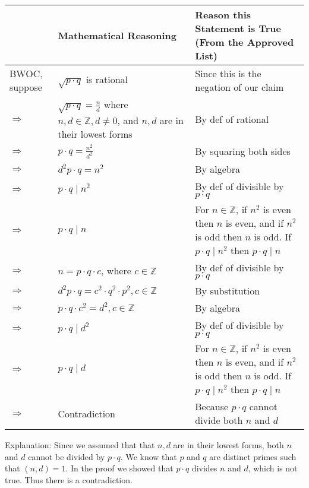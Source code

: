 \documentclass{article}
\begin{document}
\begin{flushleft}
    \begin{tabular}{|p{1.3cm}|p{5.4cm}|p{5.8cm}|}
    \hline
     & \textbf{Mathematical Reasoning} & \textbf{Reason this Statement is True (From the Approved List)} \\
    \hline
    BWOC, suppose & $\sqrt{p\cdot q}$ is rational & Since this is the negation of our claim \\
    \hline
    $\Rightarrow$ & $\sqrt{p\cdot q}=\frac{n}{d}$ where $n,d\in\mathbb{Z},d\neq 0$, and $n,d$ are in their lowest forms & By def of rational \\
    \hline
    $\Rightarrow$ & $p\cdot q=\frac{n^2}{d^2}$ & By squaring both sides \\
    \hline
    $\Rightarrow$ & $d^2p\cdot q=n^2$ & By algebra\\
    \hline
    $\Rightarrow$ & $p\cdot q\mid n^2$ & By def of divisible by $p\cdot q$ \\
    \hline
    $\Rightarrow$ & $p\cdot q\mid n$ & For $n\in\mathbb{Z}$, if $n^2$ is even then $n$ is even, and if $n^2$ is odd then $n$ is odd.  If $p\cdot q\mid n^2$ then $p\cdot q\mid n$ \\
    \hline
    $\Rightarrow$ & $n=p\cdot q\cdot c$, where $c\in\mathbb{Z}$ & By def of divisible by $p\cdot q$ \\
    \hline
    $\Rightarrow$ & $d^2p\cdot q=c^2\cdot q^2\cdot p^2,c\in\mathbb{Z}$ & By substitution \\
    \hline
    $\Rightarrow$ & $p\cdot q\cdot c^2=d^2,c\in\mathbb{Z}$ & By algebra\\
    \hline
    $\Rightarrow$ & $p\cdot q\mid d^2$ & By def of divisible by $p\cdot q$ \\
    \hline
    $\Rightarrow$ & $p\cdot q\mid d$ & For $n\in\mathbb{Z}$, if $n^2$ is even then $n$ is even, and if $n^2$ is odd then $n$ is odd.  If $p\cdot q\mid n^2$ then $p\cdot q\mid n$ \\
    \hline
    $\Rightarrow$ & Contradiction & Because $p\cdot q$ cannot divide both $n$ and $d$ \\
    \hline
    \end{tabular}
\end{flushleft}\vspace{10pt}

Explanation: Since we assumed that that $n,d$ are in their lowest forms, both $n$ and $d$ cannot be divided by $p\cdot q$.  We know that $p$ and $q$ are distinct primes such that $(n,d)=1$.  In the proof we showed that $p\cdot q$ divides $n$ and $d$, which is not true. Thus there is a contradiction.
\end{document}
